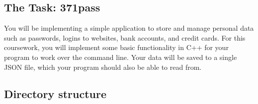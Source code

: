 \documentclass[a4paper]{article}
\begin{document}
\subsection*{The Task: 371pass}
You will be implementing a simple application to store and manage personal data such as passwords, logins to websites, bank accounts, and credit cards. For this coursework, you will implement some basic functionality in C++ for your program to work over the command line. Your data will be saved to a single JSON file, which your program should also be able to read from.


\subsection*{Directory structure}\label{sec:cwk dir}

\end{document}
